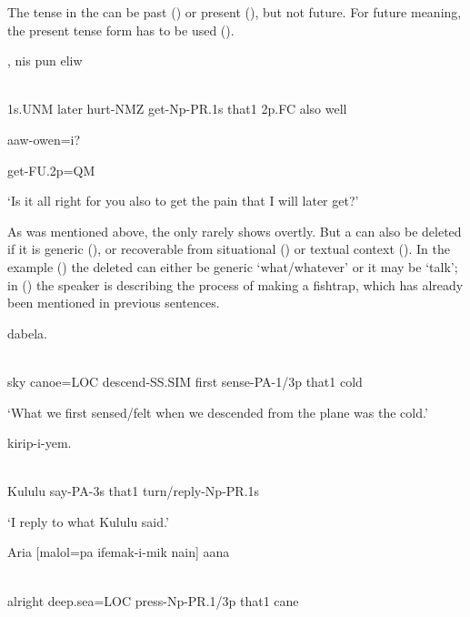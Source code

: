 The tense in the  can be past () or present (), but not future. For future meaning, the present tense form has to be used (). 

\ea%
\label{ex:x1531}
,  nis  pun  eliw  \\
      \\
\glt
\z

1s.UNM  later  hurt-NMZ  get-Np-PR.1s  that1  2p.FC  also  well

aaw-owen=i?

get-FU.2p=QM

`Is it all right for you also to get the pain that I will later get?'

As was mentioned above, the  only rarely shows overtly. But a  can also be deleted if it is generic (), or recoverable from situational () or textual context (). In the example () the deleted  can either be generic `what/whatever' or it may be  `talk'; in () the speaker is describing the process of making a fishtrap, which has already been mentioned in previous sentences.

\ea%
\label{ex:x1561}
\gll [Iinan  aasa=pa  or-omi  kiikir  furew-a-mik  nain]  dabela.  \\
      \\
\glt
\z

sky  canoe=LOC  descend-SS.SIM  first  sense-PA-1/3p  that1  cold

`What we first sensed/felt when we descended from the plane was the cold.'

\ea%
\label{ex:x1555}
  kirip-i-yem. \\
      \\
\glt
\z

Kululu  say-PA-3s  that1  turn/reply-Np-PR.1s

`I reply to what Kululu said.'

\ea%
\label{ex:x1559}
\gll Aria  [malol=pa  ifemak-i-mik  nain]  aana  \\
      \\
\glt
\z

alright  deep.sea=LOC  press-Np-PR.1/3p  that1  cane

